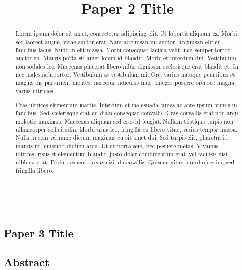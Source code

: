 \emergencystretch=\maxdimen
{}

\begin{refsection}

\title{Paper 2 Title}


\chapter{Paper 3 Title}

\vspace{-2cm}

\section{Abstract}

\vspace{-0.5em}
\begin{abstract}

Lorem ipsum dolor sit amet, consectetur adipiscing elit. Ut lobortis aliquam ex. Morbi sed laoreet augue, vitae auctor erat. Nam accumsan mi auctor, accumsan elit eu, faucibus lacus. Nunc in elit massa. Morbi consequat lacinia velit, non semper tortor auctor eu. Mauris porta sit amet lorem id blandit. Morbi et interdum dui. Vestibulum non sodales leo. Maecenas placerat libero nibh, dignissim scelerisque erat blandit et. In nec malesuada tortor. Vestibulum at vestibulum mi. Orci varius natoque penatibus et magnis dis parturient montes, nascetur ridiculus mus. Integer posuere orci sed magna varius ultricies \cite{example1}.

Cras ultrices elementum mattis. Interdum et malesuada fames ac ante ipsum primis in faucibus. Sed scelerisque erat eu diam consequat convallis. Cras convallis erat non arcu molestie maximus. Maecenas aliquam sed eros id feugiat. Nullam tristique turpis non ullamcorper sollicitudin. Morbi urna leo, fringilla eu libero vitae, varius tempor massa. Nulla in sem vel nunc dictum maximus eu sit amet dui. Sed turpis elit, pharetra id mauris ut, euismod dictum arcu. Ut ut porta sem, nec posuere metus. Vivamus ultrices, risus et elementum blandit, justo dolor condimentum erat, vel facilisis nisi nibh eu erat. Proin posuere cursus nisi id convallis. Quisque vitae interdum enim, sed fringilla libero.

\end{abstract}


\end{refsection}
